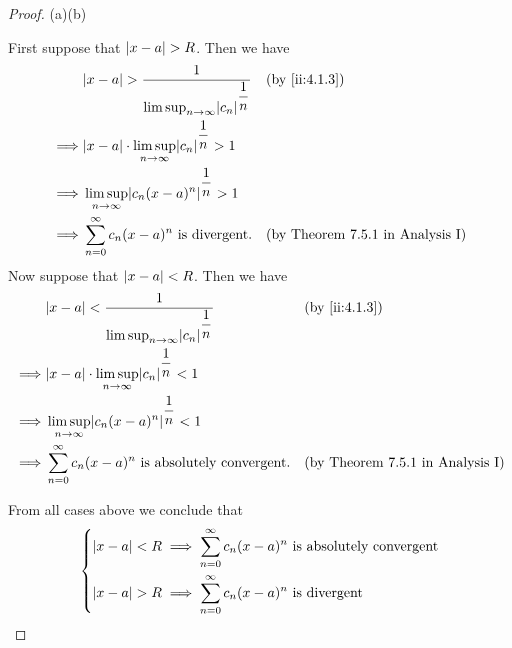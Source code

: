 \begin{proof}{(a)}{(b)}
\begin{itemize}
          First suppose that \(\left\lvert x - a\right\rvert > R\).
          Then we have
          \begin{align*}
                     & \abs{x - a} > \dfrac{1}{\limsup_{n \to \infty} \abs{c_n}^{\dfrac{1}{n}}} &  & \by{ii:4.1.3}                           \\
            \implies & \abs{x - a} \cdot \limsup_{n \to \infty} \abs{c_n}^{\dfrac{1}{n}} > 1                                                 \\
            \implies & \limsup_{n \to \infty} \abs{c_n (x - a)^n}^{\dfrac{1}{n}} > 1                                                         \\
            \implies & \sum_{n = 0}^\infty c_n (x - a)^n \text{ is divergent}.                  &  & \text{(by Theorem 7.5.1 in Analysis I)}
          \end{align*}
          Now suppose that \(\left\lvert x - a\right\rvert < R\).
          Then we have
          \begin{align*}
                     & \abs{x - a} < \dfrac{1}{\limsup_{n \to \infty} \abs{c_n}^{\dfrac{1}{n}}} &  & \by{ii:4.1.3}                           \\
            \implies & \abs{x - a} \cdot \limsup_{n \to \infty} \abs{c_n}^{\dfrac{1}{n}} < 1                                                 \\
            \implies & \limsup_{n \to \infty} \abs{c_n (x - a)^n}^{\dfrac{1}{n}} < 1                                                         \\
            \implies & \sum_{n = 0}^\infty c_n (x - a)^n \text{ is absolutely convergent}.      &  & \text{(by Theorem 7.5.1 in Analysis I)}
          \end{align*}
  \end{itemize}
  From all cases above we conclude that
  \[
    \begin{dcases}
      \left\lvert x - a\right\rvert < R \implies \sum_{n = 0}^\infty c_n (x - a)^n \text{ is absolutely convergent} \\
      \left\lvert x - a\right\rvert > R \implies \sum_{n = 0}^\infty c_n (x - a)^n \text{ is divergent}
    \end{dcases}
  \]
\end{proof}

